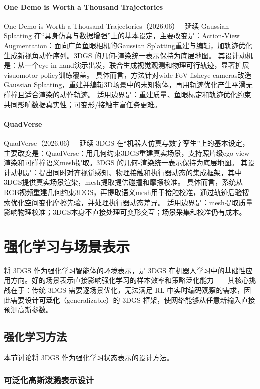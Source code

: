 \paragraph{One Demo is Worth a Thousand Trajectories}
One Demo is Worth a Thousand Trajectories（2026.06）~\cite{2606_19586} 延续 Gaussian Splatting 在“具身仿真与数据增强”上的基本设定，主要改变是：Action-View Augmentation：面向广角鱼眼相机的Gaussian Splatting重建与编辑，加轨迹优化生成新视角动作序列。3DGS 的几何-渲染统一表示保持为底层地图。
其设计动机是：从一个eye-in-hand演示出发，联合生成视觉观测和物理可行轨迹，显著扩展visuomotor policy训练覆盖。
具体而言，方法针对wide-FoV fisheye cameras改造Gaussian Splatting，重建并编辑3D场景中的未知物体，再用轨迹优化产生平滑无碰撞且适合渲染的动作轨迹。
适用边界是：重建质量、鱼眼标定和轨迹优化约束共同影响数据真实性；可变形/接触丰富任务更难。

\paragraph{QuadVerse}
QuadVerse（2026.06）~\cite{2606_07118} 延续 3DGS 在“机器人仿真与数字孪生”上的基本设定，主要改变是：QuadVerse：用几何约束3DGS重建真实场景，支持照片级ego-view渲染和可碰撞语义mesh提取。3DGS 的几何-渲染统一表示保持为底层地图。
其设计动机是：提出同时对齐视觉感知、物理接触和执行器动态的集成框架，其中3DGS提供真实场景渲染，mesh提取提供碰撞和摩擦校准。
具体而言，系统从RGB视频重建几何约束3DGS，再提取语义mesh用于接触校准，通过轨迹后验搜索优化空间变化摩擦先验，并处理执行器动态差异。
适用边界是：mesh提取质量影响物理校准；3DGS本身不直接处理可变形交互；场景采集和校准仍有成本。
\section{强化学习与场景表示}
\label{sec:17_5}

将 3DGS 作为强化学习智能体的环境表示，是 3DGS 在机器人学习中的基础性应用方向。好的场景表示直接影响强化学习的样本效率和策略泛化能力——其核心挑战在于：传统 3DGS 需要逐场景优化，无法满足 RL 中实时编码观察的需求，因此需要设计\textbf{可泛化}（generalizable）的 3DGS 框架，使网络能够从任意新输入直接预测高斯参数。

\subsection{强化学习方法}
\label{ss:17_5a}

本节讨论将 3DGS 作为强化学习状态表示的设计方法。

\subsubsection{可泛化高斯泼溅表示设计}

